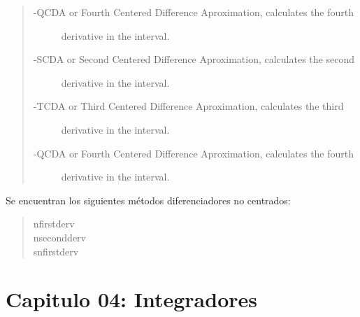 \documentclass[letterpaper,10pt,oneside]{sphinxmanual}
\theoremstyle{plain}%
\theoremstyle{definition}%
\theoremstyle{remark}%
\begin{document}
\begin{quote}
\begin{description}
\item[{-QCDA or Fourth Centered Difference Aproximation, calculates the fourth}] \leavevmode
derivative in the interval.

\item[{-SCDA or Second Centered Difference Aproximation, calculates the second}] \leavevmode
derivative in the interval.

\item[{-TCDA or Third Centered Difference Aproximation, calculates the third}] \leavevmode
derivative in the interval.

\item[{-QCDA or Fourth Centered Difference Aproximation, calculates the fourth}] \leavevmode
derivative in the interval.

\end{description}
\end{quote}

Se encuentran los siguientes métodos diferenciadores no centrados:
\begin{quote}
\begin{description}
\item[{nfirstderv}]\leavevmode
\item[{nsecondderv}]\leavevmode
\item[{snfirstderv}]\leavevmode
\end{description}
\end{quote}


\chapter{Capitulo 04: Integradores}
\label{chapter04::doc}\label{chapter04:capitulo-04-integradores}
\end{document}
